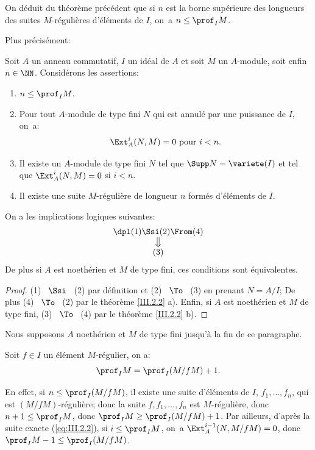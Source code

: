 On d\'eduit du th\'eor\`eme pr\'ec\'edent que si $n$ est la borne sup\'erieure des longueurs des suites $M$-r\'eguli\`eres d'\'el\'ements de $I$, on~a $n\leq\prof_I M$.

\noindent Plus pr\'ecis\'ement:

\begin{proposition} \label{III.2.4}
Soit $A$ un anneau commutatif, $I$ un id\'eal de $A$ et soit $M$ un $A$-module, soit enfin $n\in \NN$. Consid\'erons les assertions:
\begin{enumerate}
\item
$n\leq \prof_I M$.
\item
Pour tout $A$-module de type fini $N$ qui est annul\'e par une puissance de $I$, on~a:
\[
\Ext_A^i(N, M)=0 \text{ pour } i<n.
\]
\item
Il existe un $A$-module de type fini $N$ tel que $\Supp N = \variete(I)$ et tel que $\Ext_A^i(N, M)=0$ si $i<n$.
\item
Il existe une suite $M$-r\'eguli\`ere de longueur $n$ form\'es d'\'el\'ements de $I$.
\end{enumerate}

On a les implications logiques suivantes:
\[
\begin{array}{c}\dpl \textup{(1)} \Ssi \textup{(2)} \From (4) \\
\big\Downarrow \\
\textup{(3)} \\
\end{array}
\]
De plus si $A$ est noeth\'erien et $M$ de type fini, ces conditions sont \'equivalentes.
\end{proposition}

\skpt
\begin{proof}
(1) ~$\Ssi$~ (2) par d\'efinition et (2) ~$\To$~ (3) en prenant $N=A/I$; De plus (4) ~$\To$~ (2) par le th\'eor\`eme \ref{III.2.2} a). Enfin, si $A$ est noeth\'erien et $M$ de type fini, (3) ~$\To$~ (4) par le th\'eor\`eme \ref{III.2.2} b).
\skipqed
\end{proof}

Nous supposons $A$ noeth\'erien et $M$ de type fini jusqu'\`a la fin de ce paragraphe.

\begin{corollaire} \label{III.2.5}
Soit $f\in I$ un \'el\'ement $M$-r\'egulier, on a:
\[
\prof_I M = \prof_I (M/fM) + 1.
\]
\end{corollaire}

En effet, si $n\leq \prof_I (M/fM)$, il existe une suite d'\'el\'ements de $I$, $f_1, \ldots, f_n$, qui est $(M/fM)$-r\'eguli\`ere; donc la suite $f, f_1, \ldots, f_n$ est $M$-r\'eguli\`ere, donc $n+1 \leq \prof_I M$, donc $\prof_I M\geq \prof_I (M/fM) + 1$. Par ailleurs, d'apr\`es la suite exacte (\ref{eq:III.2.2}), si $i \leq \prof_I M$, on~a $\Ext_A^{i-1} (N, M/fM)=0$, donc $\prof_I M - 1 \leq \prof_I (M/fM)$.

